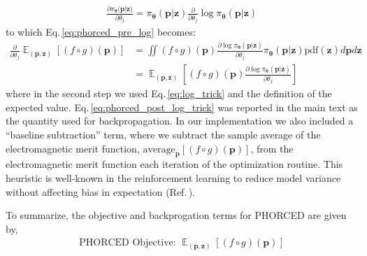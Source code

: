 \documentclass{article}
\DeclareMathOperator*{\EX}{\mathbb{E}}%
\begin{document}
\begin{align}
    \frac{\partial \pi_{\boldsymbol{\theta}}(\mathbf{p}|\mathbf{\mathbf{z})}}{\partial \theta_j} = \pi_{\boldsymbol{\theta}}(\mathbf{p}|\mathbf{z})\frac{\partial}{\partial \theta_j} \log \pi_{\boldsymbol{\theta}}(\mathbf{p}|\mathbf{z})\label{eq:log_trick}
\end{align}
to which Eq.\,\eqref{eq:phorced_pre_log} becomes:
\begin{align}
    \frac{\partial}{\partial \theta_j}\EX_{(\mathbf{p},\mathbf{z})}[(f\circ g)(\mathbf{p})]&=\iint (f\circ g)(\mathbf{p}) \frac{\partial \log \pi_{\boldsymbol{\theta}}(\mathbf{p}|\mathbf{z})}{\partial \theta_j}\pi_{\boldsymbol{\theta}}(\mathbf{p}|\mathbf{z})\text{pdf}(\mathbf{z})d\mathbf{p}d\mathbf{z} \\
    &=\EX_{(\mathbf{p},\mathbf{z})}\left[(f\circ g)(\mathbf{p})  \frac{\partial \log \pi_{\boldsymbol{\theta}}(\mathbf{p}|\mathbf{z})}{\partial \theta_j}\right]\label{eq:phorced_post_log_trick}
\end{align}
where in the second step we used Eq.\,\eqref{eq:log_trick} and the definition of the expected value. Eq.\,\eqref{eq:phorced_post_log_trick} was reported in the main text as the quantity used for backpropagation. In our implementation we also included a ``baseline subtraction'' term, where we subtract the sample average of the electromagnetic merit function, $\text{average}_{\mathbf{p}}[(f\circ g)(\mathbf{p})]$, from the electromagnetic merit function each iteration of the optimization routine. This heuristic is well-known in the reinforcement learning to reduce model variance without affecting bias in expectation (Ref.\,\cite{sutton2018reinforcement}).

To summarize, the objective and backprogation terms for PHORCED are given by,
\begin{align}
    \boxed{\text{PHORCED Objective: } \EX_{(\mathbf{p},\mathbf{z})}\left[(f\circ g)(\mathbf{p})\right]}
\end{align}
\end{document}
